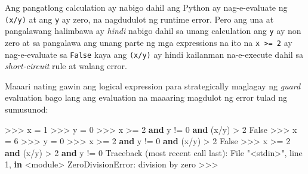 \documentclass[10pt,]{book}
\newenvironment{Shaded}{}{}
\newcommand{\DecValTok}[1]{\textcolor[rgb]{0.25,0.63,0.44}{#1}}
\newcommand{\KeywordTok}[1]{\textcolor[rgb]{0.00,0.44,0.13}{\textbf{#1}}}
\newcommand{\NormalTok}[1]{#1}
\newcommand{\OperatorTok}[1]{\textcolor[rgb]{0.40,0.40,0.40}{#1}}
\newcommand{\PreprocessorTok}[1]{\textcolor[rgb]{0.74,0.48,0.00}{#1}}
\newcommand{\StringTok}[1]{\textcolor[rgb]{0.25,0.44,0.63}{#1}}
\newcommand{\VariableTok}[1]{\textcolor[rgb]{0.10,0.09,0.49}{#1}}
\begin{document}
Ang pangatlong calculation ay nabigo dahil ang Python ay nag-e-evaluate
ng \texttt{(x/y)} at ang \texttt{y} ay zero, na nagdudulot ng runtime
error. Pero ang una at pangalawang halimbawa ay \emph{hindi} nabigo
dahil sa unang calculation ang \texttt{y} ay non zero at sa pangalawa
ang unang parte ng mga expressions na ito na
\texttt{x\ \textgreater{}=\ 2} ay nag-e-evaluate sa \texttt{False} kaya
ang \texttt{(x/y)} ay hindi kailanman na-e-execute dahil sa
\emph{short-circuit} rule at walang error.

Maaari nating gawin ang logical expression para strategically maglagay
ng \emph{guard} evaluation bago lang ang evaluation na maaaring magdulot
ng error tulad ng sumusunod:

\begin{Shaded}
\begin{Highlighting}[]
\OperatorTok{\textgreater{}\textgreater{}\textgreater{}}\NormalTok{ x }\OperatorTok{=} \DecValTok{1}
\OperatorTok{\textgreater{}\textgreater{}\textgreater{}}\NormalTok{ y }\OperatorTok{=} \DecValTok{0}
\OperatorTok{\textgreater{}\textgreater{}\textgreater{}}\NormalTok{ x }\OperatorTok{\textgreater{}=} \DecValTok{2} \KeywordTok{and}\NormalTok{ y }\OperatorTok{!=} \DecValTok{0} \KeywordTok{and}\NormalTok{ (x}\OperatorTok{/}\NormalTok{y) }\OperatorTok{\textgreater{}} \DecValTok{2}
\VariableTok{False}
\OperatorTok{\textgreater{}\textgreater{}\textgreater{}}\NormalTok{ x }\OperatorTok{=} \DecValTok{6}
\OperatorTok{\textgreater{}\textgreater{}\textgreater{}}\NormalTok{ y }\OperatorTok{=} \DecValTok{0}
\OperatorTok{\textgreater{}\textgreater{}\textgreater{}}\NormalTok{ x }\OperatorTok{\textgreater{}=} \DecValTok{2} \KeywordTok{and}\NormalTok{ y }\OperatorTok{!=} \DecValTok{0} \KeywordTok{and}\NormalTok{ (x}\OperatorTok{/}\NormalTok{y) }\OperatorTok{\textgreater{}} \DecValTok{2}
\VariableTok{False}
\OperatorTok{\textgreater{}\textgreater{}\textgreater{}}\NormalTok{ x }\OperatorTok{\textgreater{}=} \DecValTok{2} \KeywordTok{and}\NormalTok{ (x}\OperatorTok{/}\NormalTok{y) }\OperatorTok{\textgreater{}} \DecValTok{2} \KeywordTok{and}\NormalTok{ y }\OperatorTok{!=} \DecValTok{0}
\NormalTok{Traceback (most recent call last):}
\NormalTok{  File }\StringTok{"\textless{}stdin\textgreater{}"}\NormalTok{, line }\DecValTok{1}\NormalTok{, }\KeywordTok{in} \OperatorTok{\textless{}}\NormalTok{module}\OperatorTok{\textgreater{}}
\PreprocessorTok{ZeroDivisionError}\NormalTok{: division by zero}
\OperatorTok{\textgreater{}\textgreater{}\textgreater{}}
\end{Highlighting}
\end{Shaded}
\end{document}
